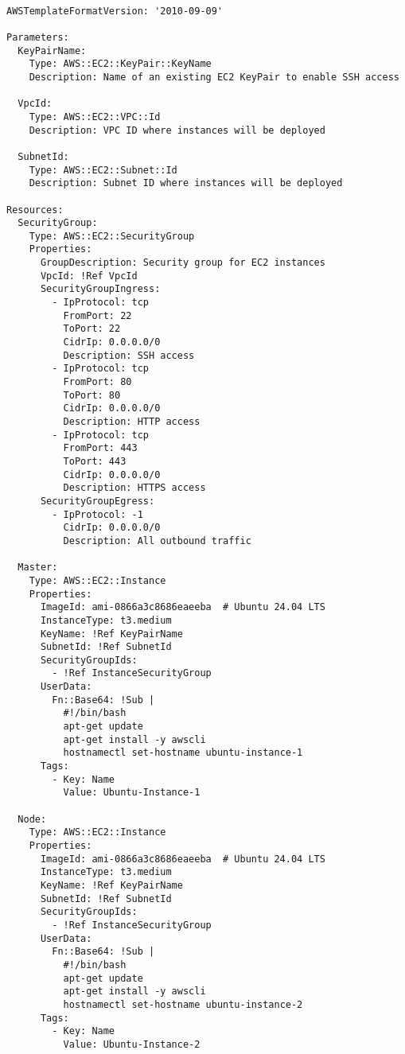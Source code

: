 \begin{lstlisting}[caption=Skrypt AWS CloudFormation do wdrożenia klastra EKS, label={lst:eks_cloudformation}]

AWSTemplateFormatVersion: '2010-09-09'

Parameters:
  KeyPairName:
    Type: AWS::EC2::KeyPair::KeyName
    Description: Name of an existing EC2 KeyPair to enable SSH access
    
  VpcId:
    Type: AWS::EC2::VPC::Id
    Description: VPC ID where instances will be deployed
    
  SubnetId:
    Type: AWS::EC2::Subnet::Id
    Description: Subnet ID where instances will be deployed

Resources:
  SecurityGroup:
    Type: AWS::EC2::SecurityGroup
    Properties:
      GroupDescription: Security group for EC2 instances
      VpcId: !Ref VpcId
      SecurityGroupIngress:
        - IpProtocol: tcp
          FromPort: 22
          ToPort: 22
          CidrIp: 0.0.0.0/0
          Description: SSH access
        - IpProtocol: tcp
          FromPort: 80
          ToPort: 80
          CidrIp: 0.0.0.0/0
          Description: HTTP access
        - IpProtocol: tcp
          FromPort: 443
          ToPort: 443
          CidrIp: 0.0.0.0/0
          Description: HTTPS access
      SecurityGroupEgress:
        - IpProtocol: -1
          CidrIp: 0.0.0.0/0
          Description: All outbound traffic

  Master:
    Type: AWS::EC2::Instance
    Properties:
      ImageId: ami-0866a3c8686eaeeba  # Ubuntu 24.04 LTS 
      InstanceType: t3.medium
      KeyName: !Ref KeyPairName
      SubnetId: !Ref SubnetId
      SecurityGroupIds:
        - !Ref InstanceSecurityGroup
      UserData:
        Fn::Base64: !Sub |
          #!/bin/bash
          apt-get update
          apt-get install -y awscli
          hostnamectl set-hostname ubuntu-instance-1
      Tags:
        - Key: Name
          Value: Ubuntu-Instance-1

  Node:
    Type: AWS::EC2::Instance
    Properties:
      ImageId: ami-0866a3c8686eaeeba  # Ubuntu 24.04 LTS
      InstanceType: t3.medium
      KeyName: !Ref KeyPairName
      SubnetId: !Ref SubnetId
      SecurityGroupIds:
        - !Ref InstanceSecurityGroup
      UserData:
        Fn::Base64: !Sub |
          #!/bin/bash
          apt-get update
          apt-get install -y awscli
          hostnamectl set-hostname ubuntu-instance-2
      Tags:
        - Key: Name
          Value: Ubuntu-Instance-2

\end{lstlisting}


